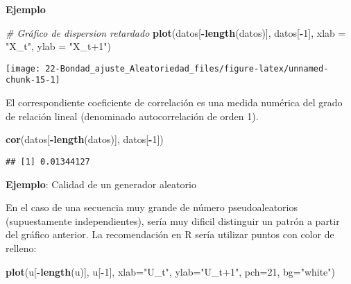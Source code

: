 \documentclass[
]{book}
\newenvironment{Shaded}{\begin{snugshade}}{\end{snugshade}}
\newcommand{\CommentTok}[1]{\textcolor[rgb]{0.56,0.35,0.01}{\textit{#1}}}
\newcommand{\DataTypeTok}[1]{\textcolor[rgb]{0.13,0.29,0.53}{#1}}
\newcommand{\DecValTok}[1]{\textcolor[rgb]{0.00,0.00,0.81}{#1}}
\newcommand{\KeywordTok}[1]{\textcolor[rgb]{0.13,0.29,0.53}{\textbf{#1}}}
\newcommand{\NormalTok}[1]{#1}
\newcommand{\OperatorTok}[1]{\textcolor[rgb]{0.81,0.36,0.00}{\textbf{#1}}}
\newcommand{\StringTok}[1]{\textcolor[rgb]{0.31,0.60,0.02}{#1}}
\theoremstyle{break}
\theoremstyle{definition}
\theoremstyle{definition}
\theoremstyle{definition}
\theoremstyle{remark}
\begin{document}
\textbf{Ejemplo}

\begin{Shaded}
\begin{Highlighting}[]
\CommentTok{# Gráfico de dispersion retardado}
\KeywordTok{plot}\NormalTok{(datos[}\OperatorTok{-}\KeywordTok{length}\NormalTok{(datos)], datos[}\OperatorTok{-}\DecValTok{1}\NormalTok{], }\DataTypeTok{xlab =} \StringTok{"X_t"}\NormalTok{, }\DataTypeTok{ylab =} \StringTok{"X_t+1"}\NormalTok{)}
\end{Highlighting}
\end{Shaded}

\begin{center}\texttt{[image: 22-Bondad\_ajuste\_Aleatoriedad\_files/figure-latex/unnamed-chunk-15-1]} \end{center}

El correspondiente coeficiente de correlación es una medida numérica
del grado de relación lineal (denominado autocorrelación de orden 1).

\begin{Shaded}
\begin{Highlighting}[]
\KeywordTok{cor}\NormalTok{(datos[}\OperatorTok{-}\KeywordTok{length}\NormalTok{(datos)], datos[}\OperatorTok{-}\DecValTok{1}\NormalTok{])}
\end{Highlighting}
\end{Shaded}

\begin{verbatim}
## [1] 0.01344127
\end{verbatim}

\textbf{Ejemplo}: Calidad de un generador aleatorio

En el caso de una secuencia muy grande de número pseudoaleatorios (supuestamente independientes), sería muy dificil distinguir un patrón a partir del gráfico anterior. La recomendación en R sería utilizar puntos con color de relleno:

\begin{Shaded}
\begin{Highlighting}[]
\KeywordTok{plot}\NormalTok{(u[}\OperatorTok{-}\KeywordTok{length}\NormalTok{(u)], u[}\OperatorTok{-}\DecValTok{1}\NormalTok{], }\DataTypeTok{xlab=}\StringTok{"U_t"}\NormalTok{, }\DataTypeTok{ylab=}\StringTok{"U_t+1"}\NormalTok{, }\DataTypeTok{pch=}\DecValTok{21}\NormalTok{, }\DataTypeTok{bg=}\StringTok{"white"}\NormalTok{)}
\end{Highlighting}
\end{Shaded}
\end{document}
